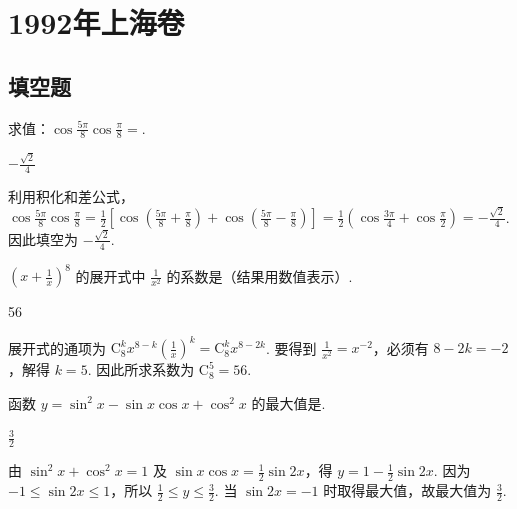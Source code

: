 \documentclass[UTF8,a4paper,oneside,11pt]{ctexbook}
\begin{document}
\mainmatter

\chapter{1992年上海卷}
\section{填空题}

\begin{problem}
求值：\(\cos \frac{5\pi}{8}\cos \frac{\pi}{8}=\)\fillinblank{}.
\end{problem}

\begin{answer}
\(-\frac{\sqrt{2}}{4}\)
\end{answer}

\begin{solution}
利用积化和差公式，\(\cos \frac{5\pi}{8}\cos \frac{\pi}{8}=\frac{1}{2}\left[\cos\left(\frac{5\pi}{8}+\frac{\pi}{8}\right)+\cos\left(\frac{5\pi}{8}-\frac{\pi}{8}\right)\right]=\frac{1}{2}\left(\cos\frac{3\pi}{4}+\cos\frac{\pi}{2}\right)=-\frac{\sqrt{2}}{4}\). 因此填空为 \(-\frac{\sqrt{2}}{4}\).
\end{solution}

\begin{problem}
\(\left(x + \frac{1}{x}\right)^8\) 的展开式中 \(\frac{1}{x^2}\) 的系数是\fillinblank{}（结果用数值表示）.
\end{problem}

\begin{answer}
56
\end{answer}

\begin{solution}
展开式的通项为 \(\mathrm C_8^k x^{8-k}\left(\frac{1}{x}\right)^k=\mathrm C_8^k x^{8-2k}\). 要得到 \(\frac{1}{x^2}=x^{-2}\)，必须有 \(8-2k=-2\)，解得 \(k=5\). 因此所求系数为 \(\mathrm C_8^5=56\).
\end{solution}

\begin{problem}
函数 \(y = \sin^2 x - \sin x \cos x + \cos^2 x\) 的最大值是\fillinblank{}.
\end{problem}

\begin{answer}
\(\frac{3}{2}\)
\end{answer}

\begin{solution}
由 \(\sin^2x+\cos^2x=1\) 及 \(\sin x\cos x=\frac{1}{2}\sin 2x\)，得 \(y=1-\frac{1}{2}\sin 2x\). 因为 \(-1\leqslant\sin 2x\leqslant1\)，所以 \(\frac{1}{2}\leqslant y\leqslant\frac{3}{2}\). 当 \(\sin 2x=-1\) 时取得最大值，故最大值为 \(\frac{3}{2}\).
\end{solution}
\end{document}
